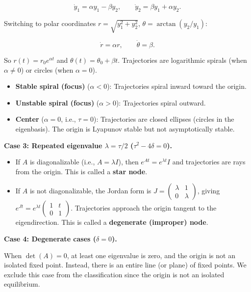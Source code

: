 \[
\dot{y}_1 = \alpha y_1 - \beta y_2, \qquad \dot{y}_2 = \beta y_1 + \alpha y_2.
\]

Switching to polar coordinates $r = \sqrt{y_1^2 + y_2^2}$, $\theta = \arctan(y_2/y_1)$:

\[
\dot{r} = \alpha r, \qquad \dot{\theta} = \beta.
\]

So $r(t) = r_0 e^{\alpha t}$ and $\theta(t) = \theta_0 + \beta t$. Trajectories are logarithmic spirals (when $\alpha \neq 0$) or circles (when $\alpha = 0$).

\begin{itemize}[nosep]
  \item \textbf{Stable spiral (focus)} ($\alpha < 0$): Trajectories spiral inward toward the origin.
  \item \textbf{Unstable spiral (focus)} ($\alpha > 0$): Trajectories spiral outward.
  \item \textbf{Center} ($\alpha = 0$, i.e., $\tau = 0$): Trajectories are closed ellipses (circles in the eigenbasis). The origin is Lyapunov stable but not asymptotically stable.
\end{itemize}

\textbf{Case 3: Repeated eigenvalue $\lambda = \tau/2$ ($\tau^2 - 4\delta = 0$).}

\begin{itemize}[nosep]
  \item If $A$ is diagonalizable (i.e., $A = \lambda I$), then $e^{At} = e^{\lambda t}I$ and trajectories are rays from the origin. This is called a \textbf{star node}.
  \item If $A$ is not diagonalizable, the Jordan form is $J = \begin{pmatrix} \lambda & 1 \\ 0 & \lambda \end{pmatrix}$, giving $e^{Jt} = e^{\lambda t}\begin{pmatrix} 1 & t \\ 0 & 1 \end{pmatrix}$. Trajectories approach the origin tangent to the eigendirection. This is called a \textbf{degenerate (improper) node}.
\end{itemize}

\textbf{Case 4: Degenerate cases ($\delta = 0$).}

When $\det(A) = 0$, at least one eigenvalue is zero, and the origin is not an isolated fixed point. Instead, there is an entire line (or plane) of fixed points. We exclude this case from the classification since the origin is not an isolated equilibrium.

